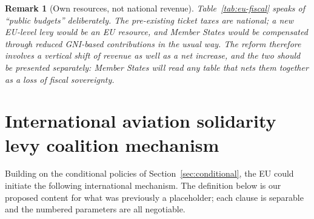 \documentclass[11pt]{article}
\newtheorem{remark}{Remark}
\begin{document}
\begin{remark}[Own resources, not national revenue]
Table~\ref{tab:eu-fiscal} speaks of ``public budgets'' deliberately. The
pre-existing ticket taxes are \emph{national}; a new EU-level levy would be an
\emph{EU} resource, and Member States would be compensated through reduced
GNI-based contributions in the usual way. The reform therefore involves a
vertical shift of revenue as well as a net increase, and the two should be
presented separately: Member States will read any table that nets them together
as a loss of fiscal sovereignty.
\end{remark}

\section{International aviation solidarity levy coalition mechanism}
\label{sec:coalition}

Building on the conditional policies of Section~\ref{sec:conditional}, the EU
could initiate the following international mechanism. The definition below is our
proposed content for what was previously a placeholder; each clause is separable
and the numbered parameters are all negotiable.
\end{document}
